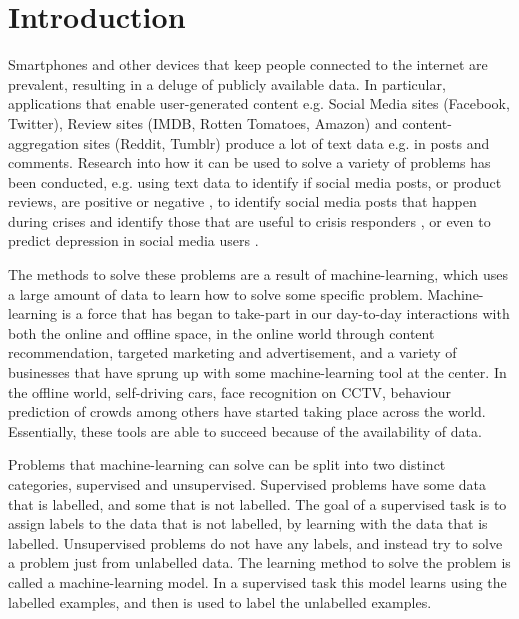 \chapter{Introduction}



Smartphones and other devices that keep people connected to the internet are prevalent, resulting in a deluge of publicly available data. In particular, applications that enable user-generated content e.g. Social Media sites (Facebook, Twitter), Review sites (IMDB, Rotten Tomatoes, Amazon) and content-aggregation sites (Reddit, Tumblr) produce a lot of text data e.g. in posts and comments. Research into how it can be used to solve a variety of problems has been conducted, e.g. using text data to identify if social media posts, or product reviews, are positive or negative \cite{Burel2018}, to identify social media posts that happen during crises and identify those that are useful to crisis responders \cite{Burel2018}, or even to predict depression in social media users \cite{Aldarwish2017}. 

The methods to solve these problems are a result of machine-learning, which uses a large amount of data to learn how to solve some specific problem. Machine-learning is a force that has began to take-part in our day-to-day interactions with both the online and offline space, in the online world through content recommendation, targeted marketing and advertisement, and a variety of businesses that have sprung up with some machine-learning tool at the center. In the offline world, self-driving cars, face recognition on CCTV, behaviour prediction of crowds among others have started taking place across the world. Essentially, these tools are able to succeed because of the availability of data.

Problems that machine-learning can solve can be split into two distinct categories, supervised and unsupervised. Supervised problems have some data that is labelled, and some that is not labelled. The goal of a supervised task is to assign labels to the data that is not labelled, by learning with the data that is labelled. Unsupervised problems do not have any labels, and instead try to solve a problem just from unlabelled data. The learning method to solve the problem is called a machine-learning model. In a supervised task this model  learns using the labelled examples, and then is used to label the unlabelled examples.


